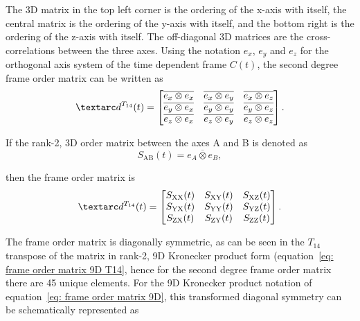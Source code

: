 The 3D matrix in the top left corner is the ordering of the x-axis with itself, the central matrix is the ordering of the y-axis with itself, and the bottom right is the ordering of the z-axis with itself.
The off-diagonal 3D matrices are the cross-correlations between the three axes.
Using the notation $e_x$, $e_y$ and $e_z$ for the orthogonal axis system of the time dependent frame $C(t)$, the second degree frame order matrix can be written as
\begin{equation}
    \FO^{T_{14}}(t) =
        \begin{bmatrix}
            \overline{e_x \otimes e_x} & \overline{e_x \otimes e_y} & \overline{e_x \otimes e_z} \\
            \overline{e_y \otimes e_x} & \overline{e_y \otimes e_y} & \overline{e_y \otimes e_z} \\
            \overline{e_z \otimes e_x} & \overline{e_z \otimes e_y} & \overline{e_z \otimes e_z}
        \end{bmatrix} .
\end{equation}

If the rank-2, 3D order matrix between the axes A and B is denoted as
\begin{equation}
    S_\textrm{AB}(t) = \overline{e_A \otimes e_B},
\end{equation}

then the frame order matrix is
\begin{equation}
    \FO^{T_{14}}(t) =
        \begin{bmatrix}
            S_\textrm{XX}(t) & S_\textrm{XY}(t) & S_\textrm{XZ}(t) \\
            S_\textrm{YX}(t) & S_\textrm{YY}(t) & S_\textrm{YZ}(t) \\
            S_\textrm{ZX}(t) & S_\textrm{ZY}(t) & S_\textrm{ZZ}(t)
        \end{bmatrix} .
\end{equation}


The frame order matrix is diagonally symmetric, as can be seen in the $T_{14}$ transpose of the matrix in rank-2, 9D Kronecker product form (equation~\ref{eq: frame order matrix 9D T14}, hence for the second degree frame order matrix there are 45 unique elements.
For the 9D Kronecker product notation of equation~\ref{eq: frame order matrix 9D}, this transformed diagonal symmetry can be schematically represented as

